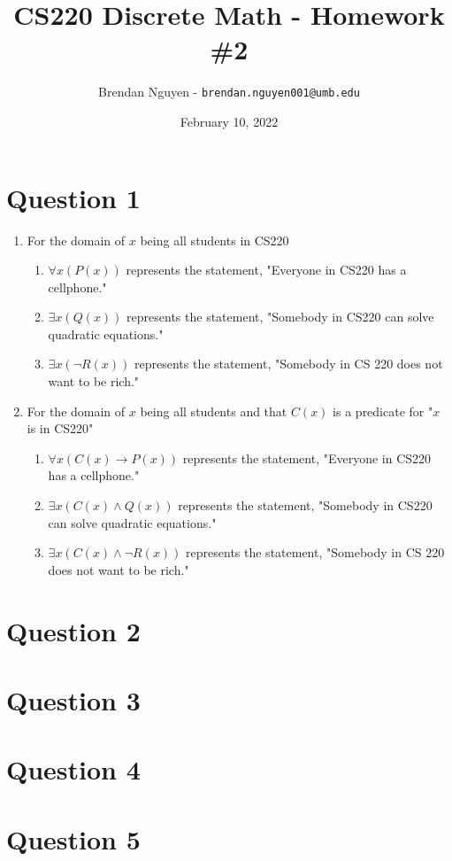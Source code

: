 \documentclass[11pt]{article}
\title{CS220 Discrete Math - Homework \#2}
\author{Brendan Nguyen - \texttt{brendan.nguyen001@umb.edu}}
\date{February 10, 2022}
\begin{document}
\maketitle

\section*{Question 1}
\renewcommand{\labelenumi}{(\alph{enumi})}
\renewcommand{\labelenumii}{\roman{enumii}.}

\begin{enumerate}
    \item For the domain of $x$ being all students in CS220
    \begin{enumerate}
        \item $\forall x(P(x))$ represents the statement, "Everyone in CS220 has a cellphone."
        \item $\exists x(Q(x))$ represents the statement, "Somebody in CS220 can solve quadratic equations."
        \item $\exists x(\neg R(x))$ represents the statement, "Somebody in CS 220 does not want to be rich."
    \end{enumerate}
    \item For the domain of $x$ being all students and that $C(x)$ is a predicate for "$x$ is in CS220" 
    \begin{enumerate}
        \item $\forall x(C(x) \to P(x))$ represents the statement, "Everyone in CS220 has a cellphone."
        \item $\exists x(C(x) \wedge Q(x))$ represents the statement, "Somebody in CS220 can solve quadratic equations."
        \item $\exists x(C(x) \wedge \neg R(x))$ represents the statement, "Somebody in CS 220 does not want to be rich."
    \end{enumerate}
\end{enumerate}

\section*{Question 2}


\section*{Question 3}


\section*{Question 4}


\section*{Question 5}
\end{document}
